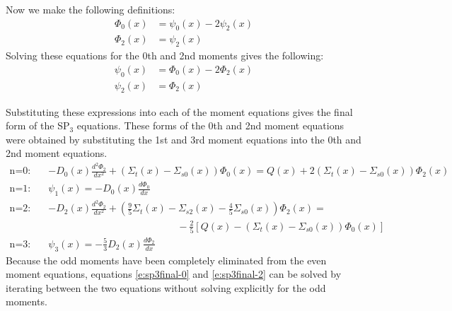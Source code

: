 Now we make the following definitions:
\begin{subequations}
  \begin{align}
  \Phi_0\left(x\right) &= \psi_0\left(x\right) - 2\psi_2\left(x\right) \\
  \Phi_2\left(x\right) &= \psi_2\left(x\right)
  \end{align}
\end{subequations}
Solving these equations for the 0th and 2nd moments gives the following:
\begin{subequations}
  \begin{align}
  \psi_0\left(x\right) &= \Phi_0\left(x\right) - 2\Phi_2\left(x\right) \\
  \psi_2\left(x\right) &= \Phi_2\left(x\right)
  \end{align}
\end{subequations}

Substituting these expressions into each of the moment equations gives the final form of the SP$_3$ equations.  These forms of the 0th and 2nd moment equations were obtained by substituting the 1st and 3rd moment equations into the 0th and 2nd moment equations.
\begin{subequations}
  \begin{align}
  \text{n=0:}\quad & -D_0\left(x\right) \frac{d^2\Phi_2}{dx^2} + \left(\Sigma_t\left(x\right) - \Sigma_{s0}\left(x\right)\right)\Phi_0\left(x\right) = Q\left(x\right) + 2\left(\Sigma_t\left(x\right) - \Sigma_{s0}\left(x\right)\right)\Phi_2\left(x\right) \label{e:sp3final-0}\\
  \text{n=1:}\quad & \psi_1\left(x\right) = -D_0\left(x\right) \frac{d\Phi_0}{dx} \label{e:sp3final-1} \\
  \text{n=2:}\quad & -D_2\left(x\right) \frac{d^2\Phi_2}{dx^2} + \left(\frac{9}{5}\Sigma_t\left(x\right) - \Sigma_{s2}\left(x\right) - \frac{4}{5}\Sigma_{s0}\left(x\right)\right)\Phi_2\left(x\right) = \nonumber \\ &\quad\quad\quad\quad\quad\quad\quad\quad\quad\quad\quad\quad\quad -\frac{2}{5}\left[Q\left(x\right) - \left(\Sigma_t\left(x\right) - \Sigma_{s0}\left(x\right)\right)\Phi_0\left(x\right)\right] \label{e:sp3final-2} \\
  \text{n=3:}\quad & \psi_3\left(x\right) = -\frac{5}{3}D_2\left(x\right)\frac{d\Phi_2}{dx} \label{e:sp3final-3}
  \end{align}
\end{subequations}
Because the odd moments have been completely eliminated from the even moment equations, equations \ref{e:sp3final-0} and \ref{e:sp3final-2} can be solved by iterating between the two equations without solving explicitly for the odd moments.

